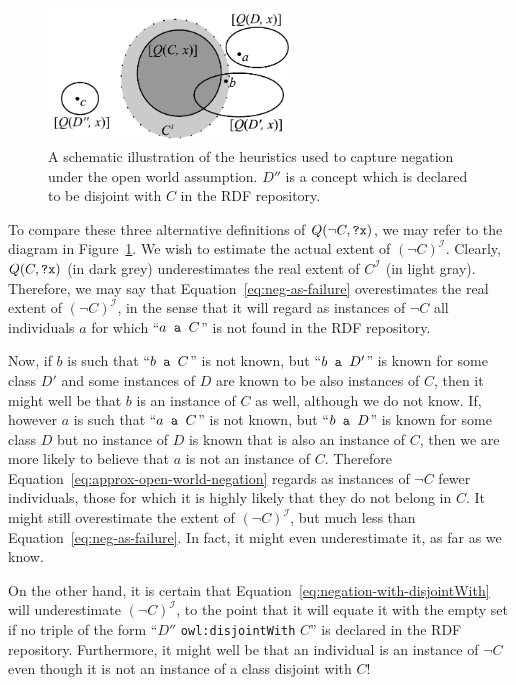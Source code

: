 \documentclass{llncs}
\begin{document}
\begin{figure}[t!]
  \begin{center}
    \includegraphics[height=1.4in]{../negation}
  \end{center}
  \caption{A schematic illustration of the heuristics used to capture negation
    under the open world assumption. $D''$ is a concept which is declared to
    be disjoint with $C$ in the RDF repository.\label{fig:negation}}
\end{figure}

To compare these three alternative definitions of $Q(\neg C, \mbox{\tt ?x})$,
we may refer to the diagram in Figure~\ref{fig:negation}. We wish to estimate
the actual extent of $(\neg C)^\mathcal{I}$. Clearly, $Q(C, \mbox{\tt ?x})$
(in dark grey) underestimates the real extent of $C^\mathcal{I}$ (in light gray).
Therefore, we may say that Equation~\ref{eq:neg-as-failure} overestimates
the real extent of $(\neg C)^\mathcal{I}$,
in the sense that it will regard as instances of $\neg C$ all individuals $a$
for which ``$a \mbox{\tt\ a } C$'' is not found in the RDF repository.

Now, if $b$ is such that ``$b \mbox{\tt\ a } C$'' is not known, but ``$b \mbox{\tt\ a } D'$''
is known for some class $D'$ and some instances of $D$ are known to be also
instances of $C$, then it might well be that $b$ is an instance of $C$ as well,
although we do not know. If, however $a$ is such that ``$a \mbox{\tt\ a } C$''
is not known, but ``$b \mbox{\tt\ a } D$'' is known for some class $D$ but
no instance of $D$ is known that is also an instance of $C$, then we are more
likely to believe that $a$ is not an instance of $C$.
Therefore Equation~\ref{eq:approx-open-world-negation} regards as instances of $\neg C$
fewer individuals, those for which it is highly likely that they do not belong
in $C$. It might still overestimate the extent of $(\neg C)^\mathcal{I}$, but much less
than Equation~\ref{eq:neg-as-failure}. In fact, it might even underestimate it,
as far as we know.

On the other hand, it is certain that Equation~\ref{eq:negation-with-disjointWith}
will underestimate $(\neg C)^\mathcal{I}$, to the point that it will equate it
with the empty set if no triple of the form ``$D''$ \texttt{owl:disjointWith} $C$''
is declared in the RDF repository. Furthermore, it might well be that an individual
is an instance of $\neg C$ even though it is not an instance of a class disjoint with $C$!
\end{document}
